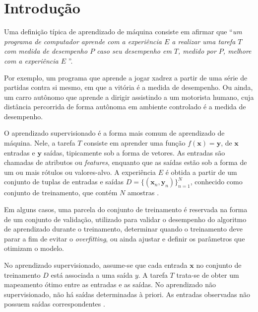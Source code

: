 \section{Introdução}

Uma definição típica de aprendizado de máquina consiste em afirmar que ``\textit{um
programa de computador aprende com a experiência $E$ a realizar uma tarefa $T$
com medida de desempenho $P$ caso seu desempenho em $T$, medido por $P$, melhore
com a experiência $E$} ''\cite{mitchell1997}.

Por exemplo, um programa que aprende a jogar xadrez a partir de uma série de
partidas contra si mesmo, em que a vitória é a medida de desempenho. Ou ainda,
um carro autônomo que aprende a dirigir assistindo a um motorista humano, cuja
distância percorrida de forma autônoma em ambiente controlado é a medida de
desempenho.

O aprendizado supervisionado é a forma mais comum de aprendizado de máquina.
Nele, a tarefa $T$ consiste em aprender uma função $f(\mathbf{x}) = \mathbf{y}$,
de $\mathbf{x}$ entradas e $\mathbf{y}$ saídas, tipicamente sob a forma de
vetores. As entradas são chamadas de atributos ou \textit{features}, enquanto
que as saídas estão sob a forma de um ou mais rótulos ou valores-alvo. A
experiência $E$ é obtida a partir de um conjunto de tuplas de entradas e saídas
$D = \{(\mathbf{x}_n, \mathbf{y}_n)\}_{n=1}^N$, conhecido como conjunto de
treinamento, que contém $N$ amostras \cite{pml1Book}.

Em alguns casos, uma parcela do conjunto de treinamento é reservada na forma de
um conjunto de validação, utilizado para validar o desempenho do algoritmo de
aprendizado durante o treinamento, determinar quando o treinamento deve parar a
fim de evitar o \textit{overfitting}, ou ainda ajustar e definir os parâmetros
que otimizam o modelo.

No aprendizado supervisionado, assume-se que cada entrada $\mathbf{x}$ no
conjunto de treinamento $D$ está associada a uma saída $y$. A tarefa $T$
trata-se de obter um mapeamento ótimo entre as entradas e as saídas. No
aprendizado não supervisionado, não há saídas determinadas à priori. As entradas
observadas não possuem saídas correspondentes \cite{pml1Book}.


